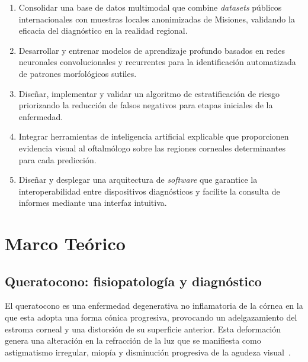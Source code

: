         \begin{enumerate}[label=\textbf{\arabic*)},leftmargin=*]
            \item Consolidar una base de datos multimodal que combine \textit{datasets} públicos internacionales  con muestras locales anonimizadas de Misiones, validando la eficacia del diagnóstico en la realidad regional.
            
            \item Desarrollar y entrenar modelos de aprendizaje profundo basados en redes neuronales convolucionales y recurrentes para la identificación automatizada de patrones morfológicos sutiles.
            
            \item Diseñar, implementar y validar un algoritmo de estratificación de riesgo priorizando la reducción de falsos negativos para etapas iniciales de la enfermedad.
            
            \item Integrar herramientas de inteligencia artificial explicable que proporcionen evidencia visual al oftalmólogo sobre las regiones corneales determinantes para cada predicción.
            
            \item Diseñar y desplegar una arquitectura de \textit{software} que garantice la interoperabilidad entre dispositivos diagnósticos y facilite la consulta de informes mediante una interfaz intuitiva.
        \end{enumerate}

\section{Marco Teórico}

    \subsection{Queratocono: fisiopatología y diagnóstico}

        El queratocono es una enfermedad degenerativa no inflamatoria de la córnea en la que esta adopta una forma cónica progresiva, provocando un adelgazamiento del estroma corneal y una distorsión de su superficie anterior. Esta deformación genera una alteración en la refracción de la luz que se manifiesta como astigmatismo irregular, miopía y disminución progresiva de la agudeza visual~.
        
